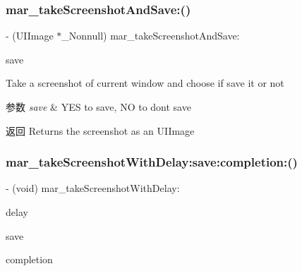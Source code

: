 \subsubsection{\texorpdfstring{mar\+\_\+take\+Screenshot\+And\+Save\+:()}{mar\_takeScreenshotAndSave:()}}
{\footnotesize\ttfamily -\/ (U\+I\+Image $\ast$\+\_\+\+Nonnull) mar\+\_\+take\+Screenshot\+And\+Save\+: \begin{DoxyParamCaption}\item[{(B\+O\+OL)}]{save }\end{DoxyParamCaption}}

Take a screenshot of current window and choose if save it or not


\begin{DoxyParams}{参数}
{\em save} & Y\+ES to save, NO to don\textquotesingle{}t save\\
\hline
\end{DoxyParams}
\begin{DoxyReturn}{返回}
Returns the screenshot as an U\+I\+Image 
\end{DoxyReturn}
\mbox{\label{category_u_i_window_07_m_a_r_e_x_08_a02248150860fdd087050f79767f67d3e}} 
\subsubsection{\texorpdfstring{mar\+\_\+take\+Screenshot\+With\+Delay\+:save\+:completion\+:()}{mar\_takeScreenshotWithDelay:save:completion:()}\hspace{0.1cm}{\footnotesize\ttfamily [1/2]}}
{\footnotesize\ttfamily -\/ (void) mar\+\_\+take\+Screenshot\+With\+Delay\+: \begin{DoxyParamCaption}\item[{(C\+G\+Float)}]{delay }\item[{save:(B\+O\+OL)}]{save }\item[{completion:(void($^\wedge$ \+\_\+\+Nullable)(U\+I\+Image $\ast$image))}]{completion }\end{DoxyParamCaption}\hspace{0.3cm}{\ttfamily [implementation]}}

